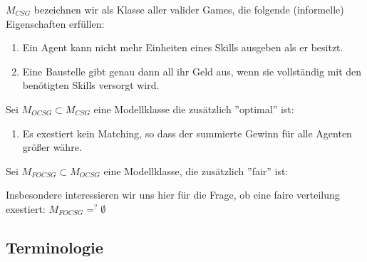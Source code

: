 $M_{CSG}$ bezeichnen wir als Klasse aller valider Games, die folgende (informelle) Eigenschaften erfüllen:
\begin{enumerate}
  \item Ein Agent kann nicht mehr Einheiten eines Skills ausgeben als er besitzt.
  \item Eine Baustelle gibt genau dann all ihr Geld aus, wenn sie vollständig mit den benötigten Skills versorgt wird.
\end{enumerate}

%

Sei $M_{OCSG} \subset M_{CSG}$ eine Modellklasse die zusätzlich ''optimal'' ist:
\begin{enumerate}
  \item Es exestiert kein Matching, so dass der summierte Gewinn für alle Agenten größer währe.
\end{enumerate}

Sei $M_{FOCSG}\subset M_{OCSG}$ eine Modellklasse, die zusätzlich ''fair'' ist:

Insbesondere interessieren wir uns hier für die Frage, ob eine faire verteilung exestiert: $M_{FOCSG} =^? \emptyset$

\subsection{Terminologie}
\label{sigmod}

